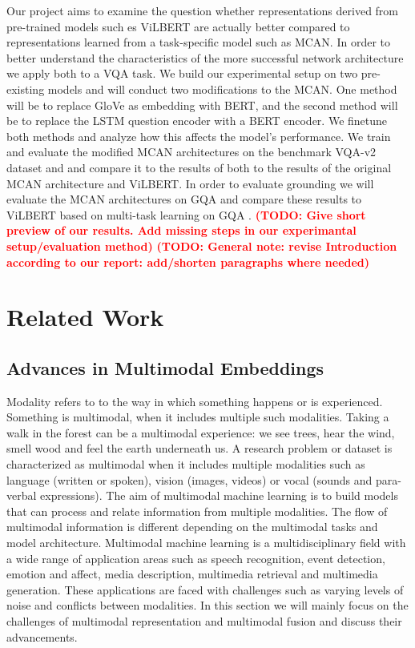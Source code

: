 \documentclass{article}
\newcommand{\todo}[1]{\textbf{\textcolor{Red}{(TODO: #1)}}}
\begin{document}
Our project aims to examine the question whether representations derived from pre-trained models such es ViLBERT are actually better compared to representations learned from a task-specific model such as MCAN. In order to better understand the characteristics of the more successful network architecture we apply both to a VQA task. We build our experimental setup on two pre-existing models and will conduct two modifications to the MCAN. One method will be to replace GloVe as embedding with BERT, and the second method will be to replace the LSTM question encoder with a BERT encoder. We finetune both methods and analyze how this affects the model’s performance. We train and evaluate the modified MCAN architectures on the benchmark VQA-v2 dataset \citep{goyal2017vqa2} and and compare it to the results of both to the results of the original MCAN architecture and ViLBERT. In order to evaluate grounding we will evaluate the MCAN architectures on GQA and compare these results to ViLBERT based on multi-task learning on GQA \citep{lu2020multitask}. \todo{Give short preview of our results. Add missing steps in our experimantal setup/evaluation method}
\todo{General note: revise Introduction according to our report: add/shorten paragraphs where needed}

\section{Related Work}
\subsection{Advances in Multimodal Embeddings} \label{embeds}
Modality refers to to the way in which something happens or is experienced. Something is multimodal, when it includes multiple such modalities. Taking a walk in the forest can be a multimodal experience: we see trees, hear the wind, smell wood and feel the earth underneath us. A research problem or dataset is characterized as multimodal when it includes multiple modalities such as language (written or spoken), vision (images, videos) or vocal (sounds and para-verbal expressions). The aim of multimodal machine learning is to build models that can process and relate information from multiple modalities. The flow of multimodal information is different depending on the multimodal tasks and model architecture. Multimodal machine learning is a multidisciplinary field with a wide range of application areas such as speech recognition, event detection, emotion and affect, media description, multimedia retrieval and multimedia generation. These applications are faced with challenges such as varying levels of noise and conflicts between modalities. In this section we will mainly focus on the challenges of multimodal representation and multimodal fusion and discuss their advancements.
\end{document}
